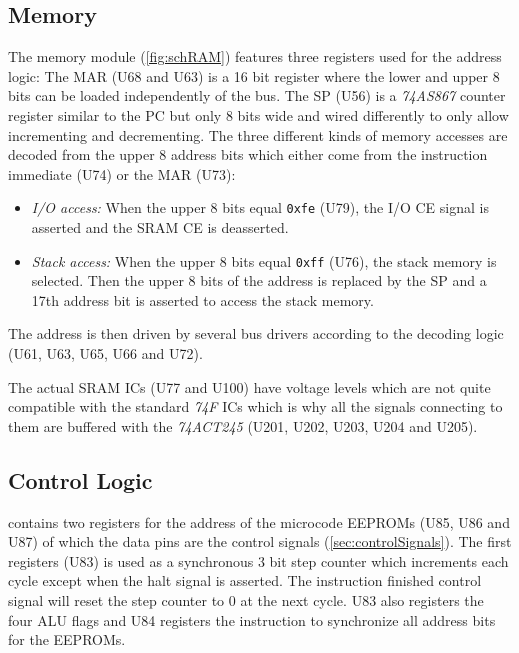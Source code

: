 \subsection{Memory}\label{sec:schMemory}
The memory module (\cref{fig:schRAM}) features three registers used for the address logic:
The \gls{MAR} (U68 and U63) is a 16 bit register where the lower and upper 8 bits can be loaded independently of the bus.
The \gls{SP} (U56) is a \emph{74AS867} counter register similar to the \gls{PC} but only 8 bits wide and wired differently to only allow incrementing and decrementing.
The three different kinds of memory accesses are decoded from the upper 8 address bits which either come from the instruction immediate (U74) or the \gls{MAR} (U73):
\begin{itemize}
  \item \emph{I/O access:} When the upper 8 bits equal \texttt{0xfe} (U79), the I/O \gls{CE} signal is asserted and the \gls{SRAM} \gls{CE} is deasserted.
  \item \emph{Stack access:} When the upper 8 bits equal \texttt{0xff} (U76), the stack memory is selected.
        Then the upper 8 bits of the address is replaced by the \gls{SP} and a 17th address bit is asserted to access the stack memory.
\end{itemize}
The address is then driven by several bus drivers according to the decoding logic (U61, U63, U65, U66 and U72).

The actual \gls{SRAM} \glspl{IC} (U77 and U100) have voltage levels which are not quite compatible with the standard \emph{74F} \glspl{IC} \cite{AS6C4008} which is why all the signals connecting to them are buffered with the \emph{74ACT245} \cite{74act245} (U201, U202, U203, U204 and U205).

\subsection{Control Logic}\label{sec:schControl}
 contains two registers for the address of the microcode \glspl{EEPROM} (U85, U86 and U87) of which the data pins are the control signals (\cref{sec:controlSignals}).
The first registers (U83) is used as a synchronous 3 bit step counter which increments each cycle except when the halt signal is asserted.
The instruction finished control signal will reset the step counter to 0 at the next cycle.
U83 also registers the four \gls{ALU} flags and U84 registers the instruction to synchronize all address bits for the \glspl{EEPROM}.

